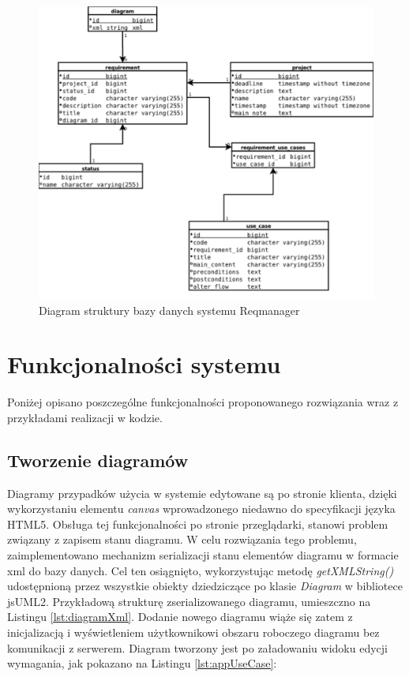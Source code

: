     \begin{figure}[p]
      \centering
      \includegraphics[width=1.0\textwidth]{img/erd2.pdf}
      \caption{Diagram struktury bazy danych systemu Reqmanager}
      \label{fig:erd1}
    \end{figure}

  \section{Funkcjonalności systemu}

    Poniżej opisano poszczególne funkcjonalności proponowanego rozwiązania wraz z przykładami realizacji w kodzie.
  
    \subsection{Tworzenie diagramów}

      Diagramy przypadków użycia w systemie edytowane są po stronie klienta, dzięki wykorzystaniu elementu \emph{canvas} wprowadzonego niedawno do specyfikacji języka HTML5. Obsługa tej funkcjonalności po stronie przeglądarki, stanowi problem związany z zapisem stanu diagramu. W celu rozwiązania tego problemu, zaimplementowano mechanizm serializacji stanu elementów diagramu w formacie xml do bazy danych. Cel ten osiągnięto, wykorzystując metodę \emph{getXMLString()} udostępnioną przez wszystkie obiekty dziedziczące po klasie \emph{Diagram} w bibliotece jsUML2. Przykładową strukturę zserializowanego diagramu, umieszczno na Listingu \ref{lst:diagramXml}. 
      Dodanie nowego diagramu wiąże się zatem z inicjalizacją i wyświetleniem użytkownikowi obszaru roboczego diagramu bez komunikacji z serwerem. Diagram tworzony jest po załadowaniu widoku edycji wymagania, jak pokazano na Listingu \ref{lst:appUseCase}:

